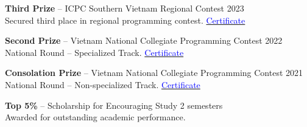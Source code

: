 \documentclass[10pt]{article}
\begin{document}
\textbf{Third Prize} -- ICPC Southern Vietnam Regional Contest \hfill 2023 \\
Secured third place in regional programming contest. \hfill \href{https://github.com/taitruong256/Competitive-programming/blob/main/2024-ICPC-Vietnam-Southern-Provincial-PC-MEDAL.pdf}{\textcolor{blue}{Certificate}}

\textbf{Second Prize} -- Vietnam National Collegiate Programming Contest \hfill 2022 \\
National Round -- Specialized Track. \hfill \href{https://github.com/taitruong256/Competitive-programming/blob/main/Bang-khen-giai-Nhi-Olympic-Tin-hoc-Sinh-vien-Viet-Nam-2022-khoi-Chuyen-tin.jpg}{\textcolor{blue}{Certificate}}

\textbf{Consolation Prize} -- Vietnam National Collegiate Programming Contest \hfill 2021 \\
National Round -- Non-specialized Track. \hfill \href{https://github.com/taitruong256/Competitive-programming/blob/main/Chung-nhan-giai-Khuyen-khich-Olympic-Tin-hoc-Sinh-vien-Viet-Nam-2021-khoi-Khong-chuyen-tin.jpg}{\textcolor{blue}{Certificate}}

\textbf{Top 5\%} -- Scholarship for Encouraging Study \hfill 2 semesters \\
Awarded for outstanding academic performance.
\end{document}
